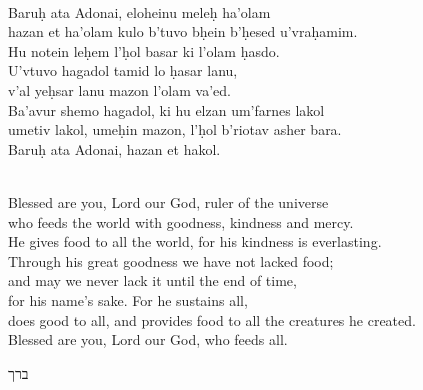 \documentclass[a4paper,12pt,openany]{memoir}
\newcommand{\hchapter}[1]{
  \begin{hebrew}
    \begin{Spacing}{.97}
      \newpage
      \strut

      \vspace{.15em}

      \noindent\Huge #1

      \vspace{1em}
    \end{Spacing}
  \end{hebrew}
}
\newenvironment{HgEnglish}{\strut\\\noindent}{\vspace{1em}}
\newenvironment{HgTranslit}{\strut\\\noindent\begin{itshape}}{\end{itshape}\vspace{1em}}
\begin{document}
\begin{HgTranslit}
  Baru\d{h} ata Adonai, eloheinu mele\d{h} ha'olam \\
  hazan et ha'olam kulo b'tuvo b\d{h}ein b'\d{h}esed u'vra\d{h}amim. \\
  Hu notein le\d{h}em l'\d{h}ol basar ki l'olam \d{h}asdo. \\
  U'vtuvo hagadol tamid lo \d{h}asar lanu, \\
  v'al ye\d{h}sar lanu mazon l'olam va'ed. \\
  Ba'avur shemo hagadol, ki hu elzan um'farnes lakol \\
  umetiv lakol, ume\d{h}in mazon, l'\d{h}ol b'riotav asher bara. \\
  Baru\d{h} ata Adonai, hazan et hakol.
\end{HgTranslit}
\begin{HgEnglish}
  Blessed are you, Lord our God, ruler of the universe \\
  who feeds the world with goodness, kindness and mercy. \\
  He gives food to all the world, for his kindness is everlasting. \\
  Through his great goodness we have not lacked food; \\
  and may we never lack it until the end of time, \\
  for his name's sake. For he sustains all, \\
  does good to all, and provides food to all the creatures he created. \\
  Blessed are you, Lord our God, who feeds all.
\end{HgEnglish}

\vfill

\hchapter{ברך}
\end{document}
